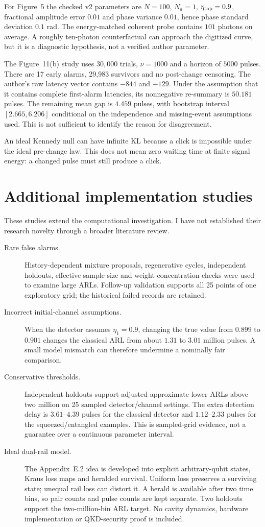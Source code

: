 \documentclass[11pt,a4paper]{article}
\begin{document}
For Figure~5 the checked v2 parameters are $N=100$, $N_a=1$,
$\eta_{\rm tap}=0.9$, fractional amplitude error $0.01$ and phase variance
$0.01$, hence phase standard deviation $0.1$ rad. The energy-matched coherent
probe contains $101$ photons on average. A roughly ten-photon counterfactual
can approach the digitized curve, but it is a diagnostic hypothesis, not
a verified author parameter.

The Figure~11(b) study uses $30{,}000$ trials, $\nu=1000$ and a horizon of
$5000$ pulses. There are 17 early alarms, 29,983 survivors and no post-change
censoring. The author's raw latency vector contains $-844$ and $-129$.
Under the assumption that it contains complete first-alarm latencies, its
nonnegative re-summary is $50.181$ pulses. The remaining mean gap is
$4.459$ pulses, with bootstrap interval $[2.665,6.206]$ conditional on the
independence and missing-event assumptions used. This is not sufficient to
identify the reason for disagreement.

An ideal Kennedy null can have infinite KL because a click is impossible
under the ideal pre-change law. This does not mean zero waiting time at
finite signal energy: a changed pulse must still produce a click.

\section{Additional implementation studies}
These studies extend the computational investigation. I have not established
their research novelty through a broader literature review.
\begin{description}
\item[Rare false alarms.]
History-dependent mixture proposals, regenerative cycles, independent holdouts,
effective sample size and weight-concentration checks were used to examine
large ARLs. Follow-up validation supports all 25 points of one exploratory
grid; the historical failed records are retained.
\item[Incorrect initial-channel assumptions.]
When the detector assumes $\eta_1=0.9$, changing the true value from $0.899$
to $0.901$ changes the classical ARL from about $1.31$ to $3.01$ million pulses.
A small model mismatch can therefore undermine a nominally fair comparison.
\item[Conservative thresholds.]
Independent holdouts support adjusted approximate lower ARLs above two million
on 25 sampled detector/channel settings. The extra detection delay is
$3.61$--$4.39$ pulses for the classical detector and $1.12$--$2.33$ pulses for
the squeezed/entangled examples. This is sampled-grid evidence, not a guarantee
over a continuous parameter interval.
\item[Ideal dual-rail model.]
The Appendix~E.2 idea is developed into explicit arbitrary-qubit states, Kraus
loss maps and heralded survival. Uniform loss preserves a surviving state;
unequal rail loss can distort it. A herald is available after two time bins,
so pair counts and pulse counts are kept separate. Two holdouts support the
two-million-bin ARL target. No cavity dynamics, hardware implementation or
QKD-security proof is included.
\end{description}
\end{document}
